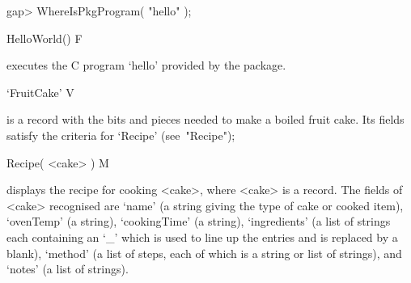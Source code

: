 \beginexample
gap> WhereIsPkgProgram( "hello" );
\endexample

\>HelloWorld() F

executes the C program `hello' provided by the {\Example} package.

\>`FruitCake' V

is a record with the bits and pieces needed to make a boiled fruit  cake.
Its fields satisfy the criteria for `Recipe' (see~"Recipe");

\>Recipe( <cake> ) M

displays the recipe for cooking <cake>, where <cake>  is  a  record.  The
fields of <cake> recognised are `name' (a string giving the type of  cake
or  cooked  item),  `ovenTemp'  (a  string),  `cookingTime'  (a  string),
`ingredients' (a list of strings each containing an `_' which is used  to
line up the entries and is replaced by a  blank),  `method'  (a  list  of
steps, each of which is a string or list of strings), and `notes' (a list
of strings).




